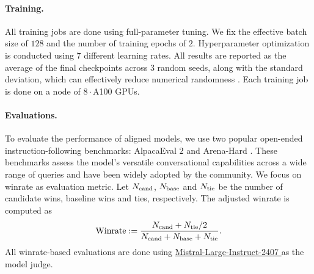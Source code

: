 \paragraph{Training.}
All training jobs are done using full-parameter tuning. 
We fix the effective batch size of $128$ and the number of training epochs of $2$.
Hyperparameter optimization is conducted using $7$ different learning rates.
All results are reported as the average of the final checkpoints across $3$ random seeds, along with the standard deviation,
which can effectively reduce numerical randomness \citep{miller2024adding}.
Each training job is done on a node of $8\cdot$A100 GPUs.

\paragraph{Evaluations.}
To evaluate the performance of aligned models,
we use two popular open-ended instruction-following benchmarks:
AlpacaEval $2$ \citep{dubois2024length} and Arena-Hard \citep{li2024live}.
These benchmarks assess the model's versatile conversational capabilities across a wide range of queries and have been widely adopted by the community.
We focus on winrate as evaluation metric.
Let $N_{\rm cand}$, $N_{\rm base}$ and $N_{\rm tie}$ be the number of candidate wins, baseline wins and ties, respectively.
The adjusted winrate is computed as 
\begin{equation*}
{\rm Winrate}
:=
\frac{N_{\rm cand} + N_{\rm tie} / 2} 
{N_{\rm cand} + N_{\rm base} + N_{\rm tie}}.
\end{equation*}
All winrate-based evaluations are done using \href{https://huggingface.co/mistralai/Mistral-Large-Instruct-2407}{Mistral-Large-Instruct-2407  } as the model judge.


